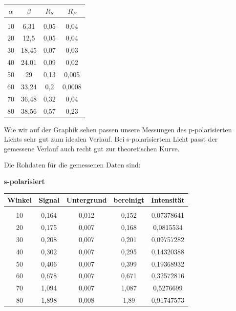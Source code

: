 \hfill

\begin{center}
	\begin{tabular}{c|c|c|c}
		$\alpha$ & $\beta$ & $R_S$   & $R_P$ \\
		\hline
		&       &       &  \\
		10    & 6,31  & 0,05  & 0,04 \\
		20    & 12,5  & 0,05  & 0,04 \\
		30    & 18,45 & 0,07  & 0,03 \\
		40    & 24,01 & 0,09  & 0,02 \\
		50    & 29    & 0,13  & 0,005 \\
		60    & 33,24 & 0,2   & 0,0008 \\
		70    & 36,48 & 0,32  & 0,04 \\
		80    & 38,56 & 0,57  & 0,23 \\
	\end{tabular}
\end{center}

\hfill

Wie wir auf der Graphik sehen passen unsere Messungen des p-polarisierten Lichts sehr gut zum idealen Verlauf. Bei s-polarisiertem Licht passt der gemessene Verlauf auch recht gut zur theoretischen Kurve.

\newpage

Die Rohdaten für die gemessenen Daten sind:

\textbf{s-polarisiert}

\begin{center}
	\begin{tabular}{c|c|c|c|c}
		Winkel & Signal & Untergrund & bereinigt & Intensität \\
		\hline
		&       &       &       &  \\
		10    & 0,164 & 0,012 & 0,152 & 0,07378641 \\
		20    & 0,175 & 0,007 & 0,168 & 0,0815534 \\
		30    & 0,208 & 0,007 & 0,201 & 0,09757282 \\
		40    & 0,302 & 0,007 & 0,295 & 0,14320388 \\
		50    & 0,406 & 0,007 & 0,399 & 0,19368932 \\
		60    & 0,678 & 0,007 & 0,671 & 0,32572816 \\
		70    & 1,094 & 0,007 & 1,087 & 0,5276699 \\
		80    & 1,898 & 0,008 & 1,89  & 0,91747573 \\
	\end{tabular}%
	
\end{center}

